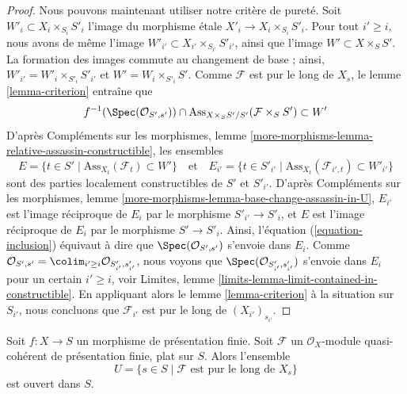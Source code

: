 \begin{proof}
\medskip\noindent
Nous pouvons maintenant utiliser notre critère de pureté.
Soit $W'_i \subset X_i \times_{S_i} S'_i$ l'image du morphisme
\'etale $X'_i \to X_i \times_{S_i} S'_i$. Pour tout $i' \geq i$,
nous avons de même l'image $W'_{i'} \subset X_{i'} \times_{S_{i'}} S'_{i'}$,
ainsi que l'image $W' \subset X \times_S S'$. La formation des images commute
au changement de base ; ainsi, $W'_{i'} = W'_i \times_{S'_i} S'_{i'}$ et
$W' = W_i \times_{S'_i} S'$. Comme
$\mathcal{F}$ est pur le long de $X_s$, le
lemme \ref{lemma-criterion}
entraîne que
\begin{equation}
\label{equation-inclusion}
f^{-1}(\Spec(\mathcal{O}_{S', s'})) \cap
\text{Ass}_{X \times_S S'/S'}(\mathcal{F} \times_S S') \subset W'
\end{equation}
D'après
Compléments sur les morphismes,
lemme \ref{more-morphisms-lemma-relative-assassin-constructible},
les ensembles
$$
E = \{t \in S' \mid \text{Ass}_{X_t}(\mathcal{F}_t) \subset W' \}
\quad\text{et}\quad
E_{i'} = \{t \in S'_{i'} \mid
\text{Ass}_{X_t}(\mathcal{F}_{i', t}) \subset W'_{i'} \}
$$
sont des parties localement constructibles de $S'$ et $S'_{i'}$. D'après
Compléments sur les morphismes,
lemme \ref{more-morphisms-lemma-base-change-assassin-in-U},
$E_{i'}$ est l'image réciproque de $E_i$ par le morphisme
$S'_{i'} \to S'_i$, et $E$ est l'image réciproque de $E_i$ par
le morphisme $S' \to S'_i$. Ainsi,
l'équation (\ref{equation-inclusion})
équivaut à dire que
$\Spec(\mathcal{O}_{S', s'})$ s'envoie dans $E_i$. Comme
$\mathcal{O}_{S', s'} =
\colim_{i' \geq i} \mathcal{O}_{S'_{i'}, s'_{i'}}$,
nous voyons que $\Spec(\mathcal{O}_{S'_{i'}, s'_{i'}})$
s'envoie dans $E_i$ pour un certain $i' \geq i$, voir
Limites, lemme \ref{limits-lemma-limit-contained-in-constructible}.
En appliquant alors le
lemme \ref{lemma-criterion}
à la situation sur $S_{i'}$,
nous concluons que $\mathcal{F}_{i'}$ est pur le long de $(X_{i'})_{s_{i'}}$.
\end{proof}

\begin{lemma}
\label{lemma-flat-finite-presentation-purity-open}
Soit $f : X \to S$ un morphisme de présentation finie.
Soit $\mathcal{F}$ un $\mathcal{O}_X$-module quasi-cohérent
de présentation finie, plat sur $S$. Alors l'ensemble
$$
U = \{s \in S \mid \mathcal{F}\text{ est pur le long de }X_s\}
$$
est ouvert dans $S$.
\end{lemma}

